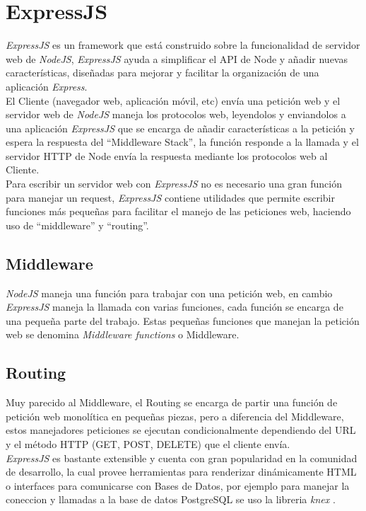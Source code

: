 \section{ExpressJS}
\label{sec:express_js}
  \emph{ExpressJS} es un framework que está construido sobre la funcionalidad de servidor web de \emph{NodeJS}, \emph{ExpressJS} ayuda a simplificar el API de Node y añadir nuevas características, diseñadas para mejorar y facilitar la organización de una aplicación \emph{Express}.\\

  El Cliente (navegador web, aplicación móvil, etc) envía una petición web y el servidor web de \emph{NodeJS} maneja los protocolos web, leyendolos y enviandolos a una aplicación \emph{ExpressJS} que se encarga de añadir características a la petición y espera la respuesta del ``Middleware Stack'', la función responde a la llamada y el servidor HTTP de Node envía la respuesta mediante los protocolos web al Cliente.\\

  Para escribir un servidor web con \emph{ExpressJS}  no es necesario una gran función para manejar un request, \emph{ExpressJS} contiene utilidades que permite escribir funciones más pequeñas para facilitar el manejo de las peticiones web, haciendo uso de ``middleware'' y ``routing''.

  \subsection{Middleware}
  \label{sub:middleware}
    \emph{NodeJS} maneja una función para trabajar con una petición web, en cambio \emph{ExpressJS} maneja la llamada con varias funciones, cada función se encarga de una pequeña parte del trabajo. Estas pequeñas funciones que manejan la petición web se denomina \emph{Middleware functions} o Middleware.


  \subsection{Routing}
  \label{sub:routing}
    Muy parecido al Middleware, el Routing se encarga de partir una función de petición web monolítica en pequeñas piezas, pero a diferencia del Middleware, estos manejadores peticiones se ejecutan condicionalmente dependiendo del URL y el método HTTP (GET, POST, DELETE) que el cliente envía.\\


  \emph{ExpressJS} es bastante extensible y cuenta con gran popularidad en la comunidad de desarrollo, la cual provee herramientas para renderizar dinámicamente HTML o interfaces para comunicarse con Bases de Datos, por ejemplo para manejar la coneccion y llamadas a la base de datos PostgreSQL se uso la libreria \emph{knex} .


